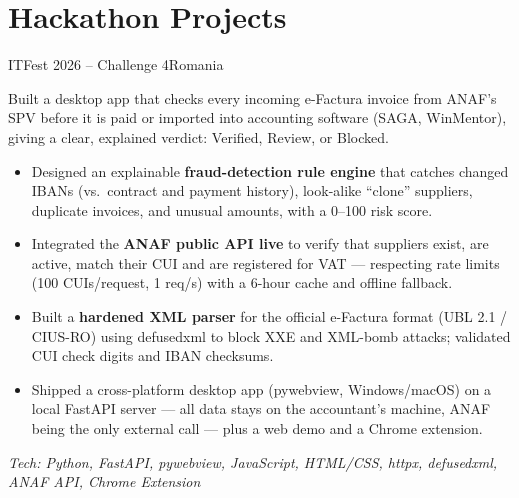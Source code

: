 \documentclass[11pt, a4paper]{moderncv}
\begin{document}
\section{Hackathon Projects}

%
        {ITFest 2026 -- Challenge 4}{Romania}{}{
  Built a desktop app that checks every incoming e-Factura invoice from ANAF's SPV
  before it is paid or imported into accounting software (SAGA, WinMentor), giving
  a clear, explained verdict: Verified, Review, or Blocked.
  \begin{itemize}
    \item Designed an explainable \textbf{fraud-detection rule engine} that catches changed IBANs (vs.\ contract and payment history), look-alike ``clone'' suppliers, duplicate invoices, and unusual amounts, with a 0--100 risk score.
    \item Integrated the \textbf{ANAF public API live} to verify that suppliers exist, are active, match their CUI and are registered for VAT --- respecting rate limits (100 CUIs/request, 1 req/s) with a 6-hour cache and offline fallback.
    \item Built a \textbf{hardened XML parser} for the official e-Factura format (UBL 2.1 / CIUS-RO) using defusedxml to block XXE and XML-bomb attacks; validated CUI check digits and IBAN checksums.
    \item Shipped a cross-platform desktop app (pywebview, Windows/macOS) on a local FastAPI server --- all data stays on the accountant's machine, ANAF being the only external call --- plus a web demo and a Chrome extension.
  \end{itemize}
  \small{\textit{Tech: Python, FastAPI, pywebview, JavaScript, HTML/CSS, httpx, defusedxml, ANAF API, Chrome Extension}}
}
\end{document}
